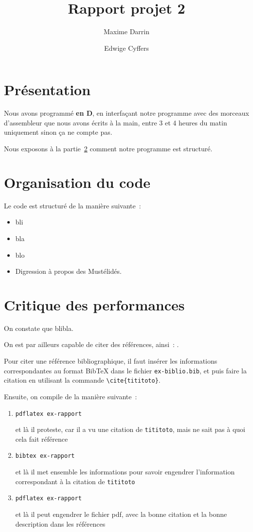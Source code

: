 \documentclass{article}
\title{Rapport projet 2}
\author{Maxime Darrin  \and Edwige Cyffers }
\date{}
\begin{document}
\maketitle

\section{Présentation}

Nous avons programmé \textbf{en D}, en interfaçant notre programme
avec des morceaux d'assembleur que nous avons écrits à la main, entre
3 et 4 heures du matin uniquement sinon ça ne compte pas.



Nous exposons à la partie~\ref{s:orga} comment notre programme est structuré.


\section{Organisation du code}
\label{s:orga}

Le code est structuré de la manière suivante~:
\begin{itemize}
\item bli
\item bla
\item blo
\item Digression à propos des Mustélidés.
\end{itemize}

\section{Critique des performances}

On constate que blibla.


On est par ailleurs capable de citer des références, ainsi~: \cite{ProjInt16}.

\medskip

Pour citer une référence bibliographique, il faut insérer les
informations correspondantes au format BibTeX dans le fichier
\texttt{ex-biblio.bib}, et puis faire la citation en utilisant la
commande \verb+\cite{tititoto}+.

Ensuite, on compile de la manière suivante~:
\begin{enumerate}
\item \texttt{pdflatex ex-rapport}

et là il proteste, car il a vu une citation de \texttt{tititoto}, mais
ne sait pas à quoi cela fait référence

\item \texttt{bibtex ex-rapport}

et là il met ensemble les informations pour savoir engendrer
l'information correspondant à la citation de \texttt{tititoto}

\item \texttt{pdflatex ex-rapport}

et là il peut engendrer le fichier pdf, avec la bonne citation et la
bonne description dans les références
\end{enumerate}




\end{document}
